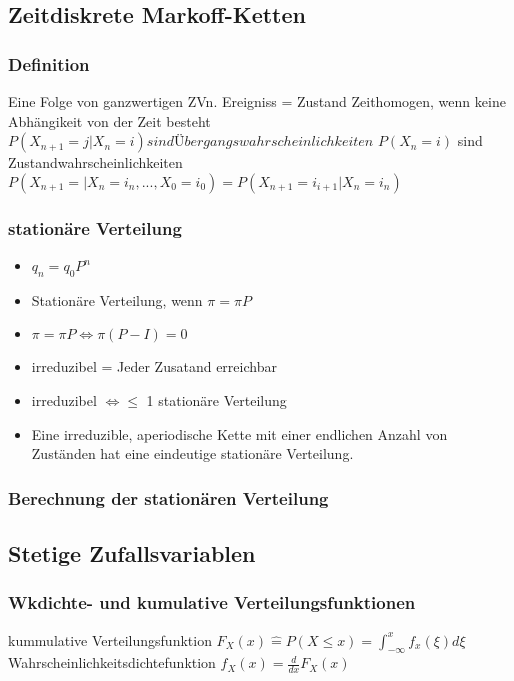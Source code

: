 \documentclass{article}
\begin{document}
\subsection{Zeitdiskrete Markoff-Ketten}
\subsubsection{Definition}

Eine Folge von ganzwertigen ZVn. \newline
Ereigniss = Zustand \newline
Zeithomogen, wenn keine Abhängikeit von der Zeit besteht \newline
$P(X_{n+1} = j | X_n = i) sind Übergangswahrscheinlichkeiten$ \newline
$P(X_n = i)$ sind Zustandwahrscheinlichkeiten \newline
$P(X_{n+1} = | X_n = i_n , ..., X_0 = i_0) = P(X_{n+1} = i_{i+1} | X_n = i_n)$


\subsubsection{station{\"a}re Verteilung}
\begin{itemize}
\item $q_n = q_0 P^n$
\item Station{\"a}re Verteilung, wenn $\pi = \pi P$ 
\item $\pi = \pi P \Leftrightarrow \pi(P - I) = 0$
\item irreduzibel = Jeder Zusatand erreichbar
\item irreduzibel $\Leftrightarrow \leq $ 1 stationäre Verteilung
\item Eine irreduzible, aperiodische Kette mit einer endlichen Anzahl von Zuständen hat eine eindeutige stationäre Verteilung.
\end{itemize}

\subsubsection{Berechnung der stationären Verteilung}


\subsection{Stetige Zufallsvariablen}
\subsubsection{Wkdichte- und kumulative Verteilungsfunktionen}
kummulative Verteilungsfunktion $F_X (x) \hat{=}  P(X \leq x ) = \int_{-\infty}^x f_x(\xi)d\xi $ \newline
Wahrscheinlichkeitsdichtefunktion $f_X(x) = \frac{d}{dx} F_X(x)$
\end{document}
